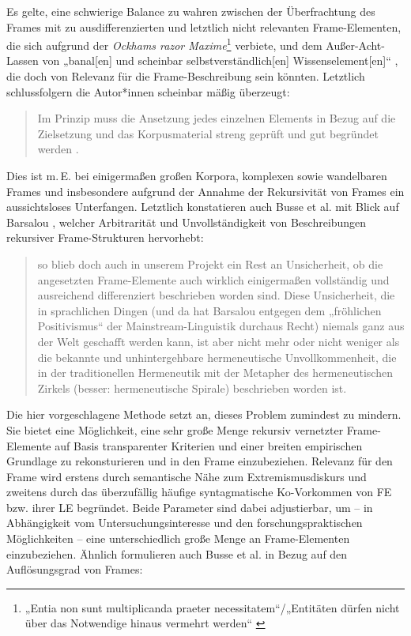 Es gelte, eine schwierige Balance zu wahren zwischen der Überfrachtung des Frames mit zu ausdifferenzierten und letztlich nicht relevanten Frame-Elementen, die sich aufgrund der \emph{Ockhams razor Maxime}\footnote{„Entia non sunt multiplicanda praeter necessitatem``{\slash}„Entitäten dürfen nicht über das Notwendige hinaus vermehrt werden`` \autocite[78]{busseBedeutungsUndBegriffswissen2018}} verbiete, und dem Außer-Acht-Lassen von „banal{[}en{]} und scheinbar selbstverständlich{[}en{]} Wissenselement{[}en{]}`` \autocite[79]{busseBedeutungsUndBegriffswissen2018}, die doch von Relevanz für die Frame-Beschreibung sein könnten. Letztlich schlussfolgern die Autor*innen scheinbar mäßig überzeugt:

\begin{quote}
Im Prinzip muss die Ansetzung jedes einzelnen Elements in Bezug auf die Zielsetzung und das Korpusmaterial streng geprüft und gut begründet werden \autocite[79]{busseBedeutungsUndBegriffswissen2018}.
\end{quote}

Dies ist m.\,E. bei einigermaßen großen Korpora, komplexen sowie wandelbaren Frames und insbesondere aufgrund der Annahme der Rekursivität von Frames ein aussichtsloses Unterfangen. Letztlich konstatieren auch Busse et al. mit Blick auf Barsalou \autocite*{barsalouFlexibilityStructureLinguistic1993}, welcher Arbitrarität und Unvollständigkeit von Beschreibungen rekursiver Frame-Strukturen hervorhebt:

\begin{quote}
so blieb doch auch in unserem Projekt ein Rest an Unsicherheit, ob die angesetzten Frame-Elemente auch wirklich einigermaßen vollständig und ausreichend differenziert beschrieben worden sind. Diese Unsicherheit, die in sprachlichen Dingen (und da hat Barsalou entgegen dem „fröhlichen Positivismus`` der Mainstream-Linguistik durchaus Recht) niemals ganz aus der Welt geschafft werden kann, ist aber nicht mehr oder nicht weniger als die bekannte und unhintergehbare hermeneutische Unvollkommenheit, die in der traditionellen Hermeneutik mit der Metapher des hermeneutischen Zirkels (besser: hermeneutische Spirale) beschrieben worden ist. \autocite[343]{busseBedeutungsUndBegriffswissen2018}
\end{quote}

Die hier vorgeschlagene Methode setzt an, dieses Problem zumindest zu mindern. Sie bietet eine Möglichkeit, eine sehr große Menge rekursiv vernetzter Frame-Elemente auf Basis transparenter Kriterien und einer breiten empirischen Grundlage zu rekonsturieren und in den Frame einzubeziehen. Relevanz für den Frame wird erstens durch semantische Nähe zum Extremismusdiskurs und zweitens durch das überzufällig häufige syntagmatische Ko-Vorkommen von FE bzw. ihrer LE begründet. Beide Parameter sind dabei adjustierbar, um -- in Abhängigkeit vom Untersuchungsinteresse und den forschungspraktischen Möglichkeiten -- eine unterschiedlich große Menge an Frame-Elementen einzubeziehen. Ähnlich formulieren auch Busse et al. in Bezug auf den Auflösungsgrad von Frames:

